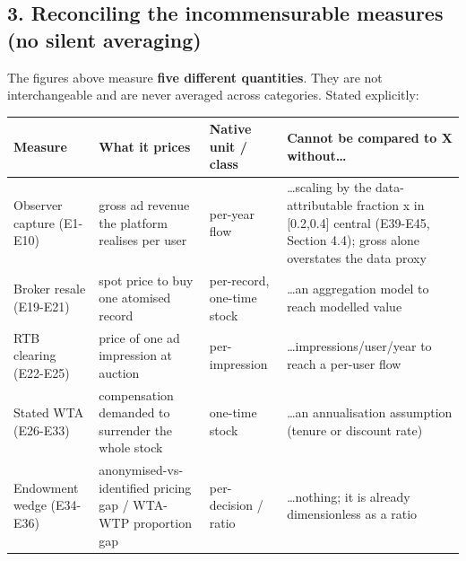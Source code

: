 \documentclass[
  11pt,
]{article}
\newcounter{none} %
\begin{document}
\subsection{3. Reconciling the incommensurable measures (no silent
averaging)}\label{reconciling-the-incommensurable-measures-no-silent-averaging}

The figures above measure \textbf{five different quantities}. They are
not interchangeable and are never averaged across categories. Stated
explicitly:

{\def\LTcaptype{none} %
\begin{longtable}[]{@{}
  >{\raggedright\arraybackslash}p{}
  >{\raggedright\arraybackslash}p{}
  >{\raggedright\arraybackslash}p{}
  >{\raggedright\arraybackslash}p{}@{}}
\toprule\noalign{}
\begin{minipage}[b]{\linewidth}\raggedright
Measure
\end{minipage} & \begin{minipage}[b]{\linewidth}\raggedright
What it prices
\end{minipage} & \begin{minipage}[b]{\linewidth}\raggedright
Native unit / class
\end{minipage} & \begin{minipage}[b]{\linewidth}\raggedright
Cannot be compared to X without\ldots{}
\end{minipage} \\
\midrule\noalign{}
\endhead
\bottomrule\noalign{}
\endlastfoot
Observer capture (E1-E10) & gross ad revenue the platform realises per
user & per-year flow & \ldots scaling by the data-attributable fraction
x in {[}0.2,0.4{]} central (E39-E45, Section 4.4); gross alone
overstates the data proxy \\
Broker resale (E19-E21) & spot price to buy one atomised record &
per-record, one-time stock & \ldots an aggregation model to reach
modelled value \\
RTB clearing (E22-E25) & price of one ad impression at auction &
per-impression & \ldots impressions/user/year to reach a per-user
flow \\
Stated WTA (E26-E33) & compensation demanded to surrender the whole
stock & one-time stock & \ldots an annualisation assumption (tenure or
discount rate) \\
Endowment wedge (E34-E36) & anonymised-vs-identified pricing gap /
WTA-WTP proportion gap & per-decision / ratio & \ldots nothing; it is
already dimensionless as a ratio \\
\end{longtable}
}
\end{document}
